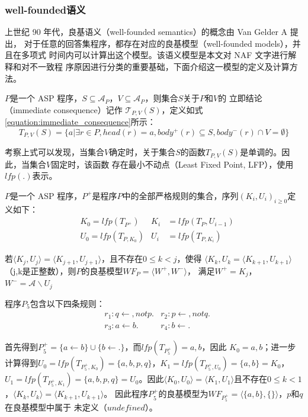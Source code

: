 \subsubsection{well-founded语义}
上世纪 90 年代，良基语义（well-founded semantics）的概念由 Van Gelder A 提出，
对于任意的回答集程序，都存在对应的良基模型（well-founded models），并且在多项式
时间内可以计算出这个模型\cite{van1991well}。该语义模型是本文对 NAF 文字进行解释和对不一致程
序原因进行分类的重要基础，下面介绍这一模型的定义及计算方法。

\begin{definition}[立即结论]
$P$是一个 ASP 程序，$S\subseteq \mathcal{A}_P，V\subseteq \mathcal{A}_P$，则集合$S$关于$P$和$V$的
立即结论（immediate consequence）记作 $\mathcal{T}_{P,V}(S)$，定义如式\eqref{equation:immediate_consequence}所示：
\begin{equation}
    T_{P,V}(S) = \{ a | \exists r \in P, head(r) = a, body^+(r) \subseteq S, body^-(r)\cap V = \emptyset \} \label{equation:immediate_consequence}
\end{equation}
\end{definition}
考察上式可以发现，当集合$V$确定时，关于集合$S$的函数$T_{P,V}(S)$是单调的。因此，当集合$V$固定时，该函数
存在最小不动点（Least Fixed Point, LFP），使用$lfp(.)$表示。

\begin{definition}[良基模型]
    $P$是一个 ASP 程序，$P^+$是程序$P$中的全部严格规则的集合，序列$(K_i,U_i)_{i \geq 0}$定义如下：
    \begin{align*}
        &K_0 = \mathit{lfp}(T_{P^+}) & K_i &= \mathit{lfp}(T_P, U_{i-1}) \\
        &U_0 = \mathit{lfp}(T_{P, K_0}) & U_i &= \mathit{lfp}(T_{P, K_i})
    \end{align*}
\end{definition}
若$\langle K_j,U_j \rangle = \langle K_{j+1},U_{j+1} \rangle$，且不存在$0 \leq k < j$，使得
$\langle K_k, U_k = \langle K_{k+1},U_{k+1} \rangle$（j,k是正整数），则$P$的良基模型$WF_P=\langle W^+,W^- \rangle$，
满足$W^+=K_j$，$W^-=\mathcal{A}\backslash U_j$
\begin{example}[良基模型]
    程序$P_5$包含以下四条规则：
    \begin{align*}
        &r_1:q \leftarrow , not p. &r_2: p \leftarrow, not q. \\
        &r_3:a \leftarrow b. &r_4: b \leftarrow. 
    \end{align*}
\end{example}
首先得到$P_5^+=\{ a \leftarrow b \} \cup \{b \leftarrow . \}$，而$lfp(T_{P_5^+}) = {a, b}$，因此
$K_0 = {a,b}$；进一步计算得到$U_0 = lfp(T_{P_5^+, K_0}) = \{ a,b,p,q \}$，$K_1 = lfp(T_{P_5^+, U_0}) = 
\{ a, b \} = K_0$，$U_1 = lfp(T_{P_5^+,K_1}) = \{ a,b,p,q \} = U_0$。因此$\langle K_0, U_0 \rangle = 
\langle K_1, U_1 \rangle$且不存在$0 \leq k < 1$，$\langle K_k, U_k \rangle = \langle K_{k+1}, U_{k+1} \rangle$。
因此程序$P_5^+$的良基模型为$WF_{P_5^+} = \langle \{a, b\}, \{ \} \rangle$，$p$和$q$在良基模型中属于
未定义（$undefined$）。
